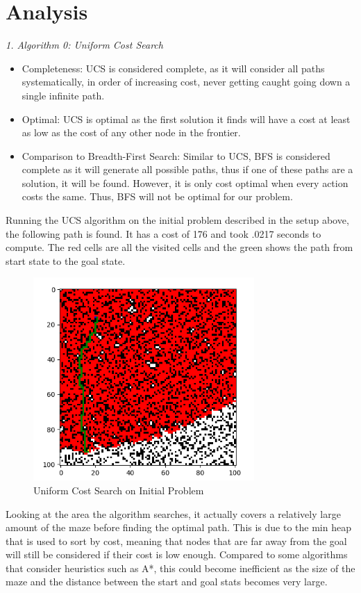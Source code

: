 \documentclass[a4paper]{article}
\begin{document}
\section*{{Analysis}}
\textit{1. Algorithm 0: Uniform Cost Search}
\begin{itemize}
    \item Completeness: UCS is considered complete, as it will consider all paths systematically, in order of increasing cost, never getting caught going down a single infinite path.
    \item Optimal: UCS is optimal as the first solution it finds will have a cost at least as low as the cost of any other node in the frontier.
    \item Comparison to Breadth-First Search: Similar to UCS, BFS is considered complete as it will generate all possible paths, thus if one of these paths are a solution, it will be found. However, it is only cost optimal when every action costs the same. Thus, BFS will not be optimal for our problem.
\end{itemize}
Running the UCS algorithm on the initial problem described in the setup above, the following path is found. It has a cost of 176 and took .0217 seconds to compute. The red cells are all the visited cells and the green shows the path from start state to the goal state.
\begin{figure}[ht]
    \centering
    \includegraphics[width=0.75\textwidth]{fig2.png}
    \caption{Uniform Cost Search on Initial Problem}
    \label{fig:UCS}
\end{figure}
\newline
Looking at the area the algorithm searches, it actually covers a relatively large amount of the maze before finding the optimal path. This is due to the min heap that is used to sort by cost, meaning that nodes that are far away from the goal will still be considered if their cost is low enough. Compared to some algorithms that consider heuristics such as A*, this could become inefficient as the size of the maze and the distance between the start and goal stats becomes very large.
\end{document}
